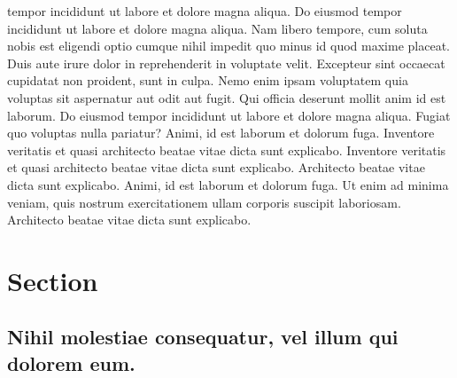 \documentclass[]{report}
\begin{document}
tempor incididunt ut labore et dolore magna aliqua. Do eiusmod tempor
incididunt ut labore et dolore magna aliqua. Nam libero tempore, cum
soluta nobis est eligendi optio cumque nihil impedit quo minus id quod
maxime placeat. Duis aute irure dolor in reprehenderit in voluptate
velit. Excepteur sint occaecat cupidatat non proident, sunt in culpa.
Nemo enim ipsam voluptatem quia voluptas sit aspernatur aut odit aut
fugit. Qui officia deserunt mollit anim id est laborum. Do eiusmod
tempor incididunt ut labore et dolore magna aliqua. Fugiat quo voluptas
nulla pariatur? Animi, id est laborum et dolorum fuga. Inventore
veritatis et quasi architecto beatae vitae dicta sunt explicabo.
Inventore veritatis et quasi architecto beatae vitae dicta sunt
explicabo. Architecto beatae vitae dicta sunt explicabo. Animi, id est
laborum et dolorum fuga. Ut enim ad minima veniam, quis nostrum
exercitationem ullam corporis suscipit laboriosam. Architecto beatae
vitae dicta sunt explicabo.

\section{Section}\label{section-1.2}

\subsection{Nihil molestiae consequatur, vel illum qui dolorem
eum.}\label{nihil-molestiae-consequatur-vel-illum-qui-dolorem-eum.}
\end{document}
